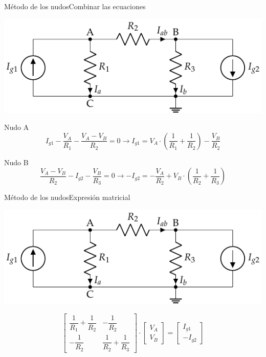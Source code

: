 \documentclass[aspectratio=169, xcolor={usenames,svgnames,dvipsnames}]{beamer}
\begin{document}
\begin{frame}{Método de los nudos}{Combinar las ecuaciones}
\begin{center}
\includegraphics[width=.7\linewidth]{../figs/nudos.pdf}
\end{center}

Nudo A
\begin{equation*}
  I_{g1} - \dfrac{V_A}{R_1} - \dfrac{V_A - V_B}{R_2} = 0 \rightarrow I_{g1} = V_A\cdot\left(\dfrac{1}{R_1}+\dfrac{1}{R_2}\right) - \dfrac{V_B}{R_2} 
\end{equation*}

Nudo B
\begin{equation*}
  \dfrac{V_A - V_B}{R_2} - I_{g2} - \dfrac{V_B}{R_3} = 0 \rightarrow - I_{g2} = - \dfrac{V_A}{R_2} + V_B \cdot\left(\dfrac{1}{R_2} + \dfrac{1}{R_3}\right)
\end{equation*}
\end{frame}

\begin{frame}{Método de los nudos}{Expresión matricial}
\begin{center}
\includegraphics[width=.7\linewidth]{../figs/nudos.pdf}
\end{center}
\begin{equation*}
  \begin{bmatrix}
    \dfrac{1}{R_1}+\dfrac{1}{R_2} & - \dfrac{1}{R_2}\\
    -\dfrac{1}{R_2} & \dfrac{1}{R_2}+\dfrac{1}{R_3}
  \end{bmatrix} \cdot%
  \begin{bmatrix}
    V_A\\
    V_B
  \end{bmatrix} = %
  \begin{bmatrix}
    I_{g1}\\
    -I_{g2}
  \end{bmatrix}
\end{equation*}
\end{frame}
\end{document}
